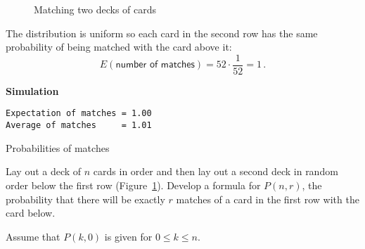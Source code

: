 \begin{figure}[tb]
\begin{center}
\end{center}
\caption{Matching two decks of cards}\label{f.cards}
\end{figure}

\solution{}

The distribution is uniform so each card in the second row has the same probability of being matched with the card above it:
\[
E(\textsf{number of matches}) = 52\cdot \frac{1}{52} = 1\,.
\]

\newpage

\textbf{Simulation}

\begin{verbatim}
Expectation of matches = 1.00
Average of matches     = 1.01
\end{verbatim}


\begin{prob}{Probabilities of matches}

Lay out a deck of $n$ cards in order and then lay out a second deck in random order below the first row (Figure~\ref{f.cards}). Develop a formula for $P(n,r)$, the probability that there will be exactly $r$ matches of a card in the first row with the card below.

Assume that $P(k,0)$ is given for $0\leq k\leq n$.
\end{prob}

